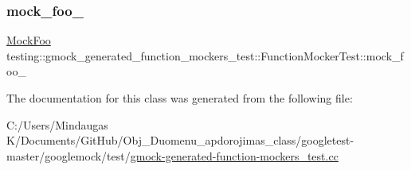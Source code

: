 \mbox{\label{classtesting_1_1gmock__generated__function__mockers__test_1_1_function_mocker_test_a265659f07a0e75152ab295add4769585}} 
\subsubsection{\texorpdfstring{mock\_foo\_}{mock\_foo\_}}
{\footnotesize\ttfamily \mbox{\hyperlink{classtesting_1_1gmock__generated__function__mockers__test_1_1_mock_foo}{Mock\+Foo}} testing\+::gmock\+\_\+generated\+\_\+function\+\_\+mockers\+\_\+test\+::\+Function\+Mocker\+Test\+::mock\+\_\+foo\+\_\+\hspace{0.3cm}{\ttfamily [protected]}}



The documentation for this class was generated from the following file\+:\begin{DoxyCompactItemize}
\item 
C\+:/\+Users/\+Mindaugas K/\+Documents/\+Git\+Hub/\+Obj\+\_\+\+Duomenu\+\_\+apdorojimas\+\_\+class/googletest-\/master/googlemock/test/\mbox{\hyperlink{googletest-master_2googlemock_2test_2gmock-generated-function-mockers__test_8cc}{gmock-\/generated-\/function-\/mockers\+\_\+test.\+cc}}\end{DoxyCompactItemize}
